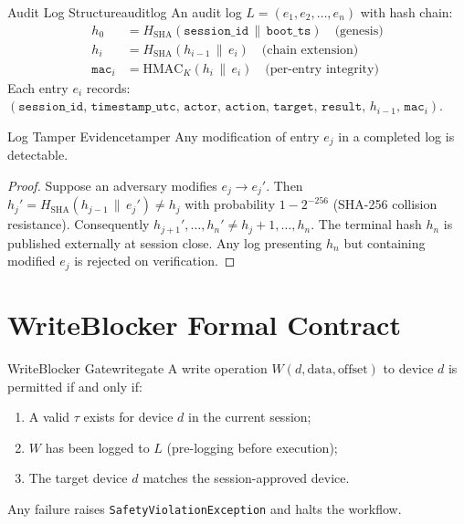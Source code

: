 \documentclass[11pt,a4paper]{report}
\begin{document}
\begin{definition}{Audit Log Structure}{auditlog}
An audit log $L = (e_1, e_2, \ldots, e_n)$ with hash chain:
\begin{align*}
  h_0 &= H_{\mathrm{SHA}}(\mathtt{session\_id} \,\|\, \mathtt{boot\_ts}) \quad \text{(genesis)} \\
  h_i &= H_{\mathrm{SHA}}(h_{i-1} \,\|\, e_i) \quad \text{(chain extension)} \\
  \mathtt{mac}_i &= \mathrm{HMAC}_K(h_i \,\|\, e_i) \quad \text{(per-entry integrity)}
\end{align*}
Each entry $e_i$ records: $(\mathtt{session\_id},\, \mathtt{timestamp\_utc},\, \mathtt{actor},\, \mathtt{action},\, \mathtt{target},\, \mathtt{result},\, h_{i-1},\, \mathtt{mac}_i)$.
\end{definition}

\begin{theorem}{Log Tamper Evidence}{tamper}
Any modification of entry $e_j$ in a completed log is detectable.
\end{theorem}

\begin{proof}
Suppose an adversary modifies $e_j \to e_j'$. Then $h_j' = H_{\mathrm{SHA}}(h_{j-1} \,\|\, e_j') \neq h_j$ with probability $1 - 2^{-256}$ (SHA-256 collision resistance). Consequently $h_{j+1}', \ldots, h_n' \neq h_j+1, \ldots, h_n$. The terminal hash $h_n$ is published externally at session close. Any log presenting $h_n$ but containing modified $e_j$ is rejected on verification.
\end{proof}

\section{WriteBlocker Formal Contract}

\begin{definition}{WriteBlocker Gate}{writegate}
A write operation $W(d, \text{data}, \text{offset})$ to device $d$ is permitted if and only if:
\begin{enumerate}[label=(\roman*)]
  \item A valid $\tau$ exists for device $d$ in the current session;
  \item $W$ has been logged to $L$ (pre-logging before execution);
  \item The target device $d$ matches the session-approved device.
\end{enumerate}
Any failure raises \texttt{SafetyViolationException} and halts the workflow.
\end{definition}
\end{document}

